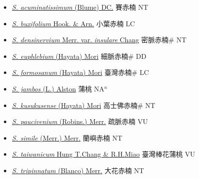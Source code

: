 \begin{itemize}
  \begin{itemize}
        \item[] \href{http://www.theplantlist.org/tpl1.1/search?q=Syzygium+acuminatissimum}{\textit{S. acuminatissimum} (Blume) DC.}     賽赤楠 NT
        \item[] \href{http://www.theplantlist.org/tpl1.1/search?q=Syzygium+buxifolium}{\textit{S. buxifolium} Hook. \& Arn.}   小葉赤楠 LC
        \item[] \href{http://www.theplantlist.org/tpl1.1/search?q=Syzygium+densinervium+var.+insulare}{\textit{S. densinervium} Merr. var. \textit{insulare} Chang}   密脈赤楠\# NT
        \item[] \href{http://www.theplantlist.org/tpl1.1/search?q=Syzygium+euphlebium}{\textit{S. euphlebium} (Hayata) Mori}   細脈赤楠\# DD
        \item[] \href{http://www.theplantlist.org/tpl1.1/search?q=Syzygium+formosanum}{\textit{S. formosanum} (Hayata) Mori}   臺灣赤楠\# LC
        \item[] \href{http://www.theplantlist.org/tpl1.1/search?q=Syzygium+jambos}{\textit{S. jambos} (L.) Alston}   蒲桃 NA$^n$
        \item[] \href{http://www.theplantlist.org/tpl1.1/search?q=Syzygium+kusukusense}{\textit{S. kusukusense} (Hayata) Mori}   高士佛赤楠\# NT
        \item[] \href{http://www.theplantlist.org/tpl1.1/search?q=Syzygium+paucivenium}{\textit{S. paucivenium} (Robins.) Merr.}   疏脈赤楠 VU
        \item[] \href{http://www.theplantlist.org/tpl1.1/search?q=Syzygium+simile}{\textit{S. simile} (Merr.) Merr.}   蘭嶼赤楠 NT
        \item[] \href{http://www.theplantlist.org/tpl1.1/search?q=Syzygium+taiwanicum}{\textit{S. taiwanicum} Hung T.Chang \& R.H.Miao}   臺灣棒花蒲桃 VU
        \item[] \href{http://www.theplantlist.org/tpl1.1/search?q=Syzygium+tripinnatum}{\textit{S. tripinnatum} (Blanco) Merr.}   大花赤楠 NT
  \end{itemize}
  \end{itemize}
